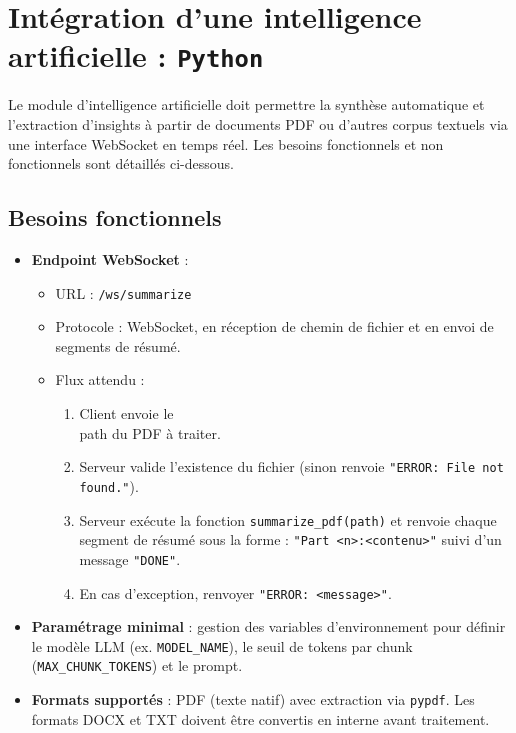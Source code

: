\documentclass[12pt]{rapportPfe}
\begin{document}

\newpage
\section{Intégration d'une intelligence artificielle : \texttt{Python}}
Le module d’intelligence artificielle doit permettre la synthèse automatique et l’extraction d’insights à partir de documents PDF ou d’autres corpus textuels via une interface WebSocket en temps réel. Les besoins fonctionnels et non fonctionnels sont détaillés ci-dessous.

\subsection{Besoins fonctionnels}
\begin{itemize}[itemsep=0.8em]
  \item \textbf{Endpoint WebSocket} : 
    \begin{itemize}
      \item URL : \texttt{/ws/summarize}
      \item Protocole : WebSocket, en réception de chemin de fichier et en envoi de segments de résumé.
      \item Flux attendu :
        \begin{enumerate}
          \item Client envoie le \\path du PDF à traiter.
          \item Serveur valide l’existence du fichier (sinon renvoie \texttt{"ERROR: File not found."}).
          \item Serveur exécute la fonction \texttt{summarize\_pdf(path)} et renvoie chaque segment de résumé sous la forme : 
            \texttt{"Part <n>:<contenu>"} suivi d’un message \texttt{"DONE"}.
          \item En cas d’exception, renvoyer \texttt{"ERROR: <message>"}.
        \end{enumerate}
    \end{itemize}
  \item \textbf{Paramétrage minimal} : gestion des variables d’environnement pour définir le modèle LLM (ex. \texttt{MODEL\_NAME}), le seuil de tokens par chunk (\texttt{MAX\_CHUNK\_TOKENS}) et le prompt.
  \item \textbf{Formats supportés} : PDF (texte natif) avec extraction via \texttt{pypdf}. Les formats DOCX et TXT doivent être convertis en interne avant traitement.
\end{itemize}
\end{document}
